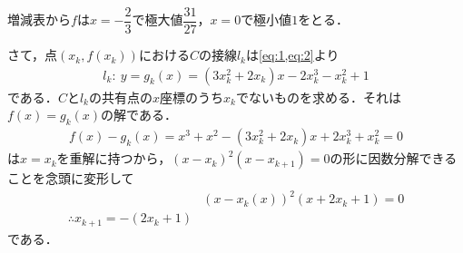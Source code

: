 \documentclass[../../main.tex]{subfiles}
\begin{document}
増減表から$f$は$x=-\dfrac{2}{3}$で極大値$\dfrac{31}{27}$，$x=0$で極小値$1$をとる．

さて，点$(x_k,f(x_k))$における$C$の接線$l_k$は\cref{eq:1,eq:2}より
\begin{align}
  l_k:\ y=g_k(x)=(3x_k^2+2x_k)x-2x_k^3-x_k^2+1
\end{align}
である．$C$と$l_k$の共有点の$x$座標のうち$x_k$でないものを求める．それは$f(x)=g_k(x)$の解である．
\begin{align}
  f(x)-g_k(x) = x^3+x^2-(3x_k^2+2x_k)x+2x_k^3+x_k^2=0
\end{align}
は$x=x_k$を重解に持つから，$(x-x_k)^2(x-x_{k+1})=0$の形に因数分解できることを念頭に変形して
\begin{align}
  & \left(x-x_k(x)\right)^2\left(x + 2x_k+1\right) = 0 \\
  \therefore
  x_{k+1}=-(2x_k+1) \label{eq:3}
\end{align}
である．
\end{document}
